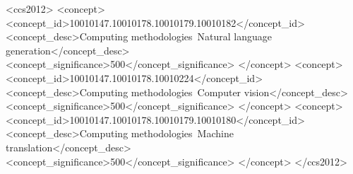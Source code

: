 \documentclass[sigconf]{acmart}
\begin{document}
\begin{CCSXML}
<ccs2012>
   <concept>
       <concept_id>10010147.10010178.10010179.10010182</concept_id>
       <concept_desc>Computing methodologies~Natural language generation</concept_desc>
       <concept_significance>500</concept_significance>
       </concept>
   <concept>
       <concept_id>10010147.10010178.10010224</concept_id>
       <concept_desc>Computing methodologies~Computer vision</concept_desc>
       <concept_significance>500</concept_significance>
       </concept>
   <concept>
       <concept_id>10010147.10010178.10010179.10010180</concept_id>
       <concept_desc>Computing methodologies~Machine translation</concept_desc>
       <concept_significance>500</concept_significance>
       </concept>
 </ccs2012>
\end{CCSXML}




\maketitle
\end{document}
